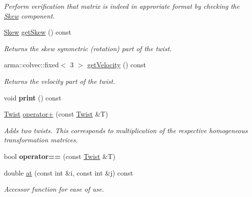 \begin{DoxyCompactItemize}
\begin{DoxyCompactList}\small\item\em Perform verification that matrix is indeed in approriate format by checking the \hyperlink{class_skew}{Skew} component. \end{DoxyCompactList}\item 
\hypertarget{class_twist_ac1bb79a35b3ae5fcd78cbe805faaf1d4}{\hyperlink{class_skew}{Skew} \hyperlink{class_twist_ac1bb79a35b3ae5fcd78cbe805faaf1d4}{get\+Skew} () const }\label{class_twist_ac1bb79a35b3ae5fcd78cbe805faaf1d4}

\begin{DoxyCompactList}\small\item\em Returns the skew symmetric (rotation) part of the twist. \end{DoxyCompactList}\item 
\hypertarget{class_twist_aec0ab96d3cc03f1c280cc01fc6cfda3f}{arma\+::colvec\+::fixed$<$ 3 $>$ \hyperlink{class_twist_aec0ab96d3cc03f1c280cc01fc6cfda3f}{get\+Velocity} () const }\label{class_twist_aec0ab96d3cc03f1c280cc01fc6cfda3f}

\begin{DoxyCompactList}\small\item\em Returns the velocity part of the twist. \end{DoxyCompactList}\item 
\hypertarget{class_twist_a72a0c4cda47dcd5262280cc51149d2c1}{void {\bfseries print} () const }\label{class_twist_a72a0c4cda47dcd5262280cc51149d2c1}

\item 
\hypertarget{class_twist_a9edb824a00487857996ab2fb9b1437e4}{\hyperlink{class_twist}{Twist} \hyperlink{class_twist_a9edb824a00487857996ab2fb9b1437e4}{operator+} (const \hyperlink{class_twist}{Twist} \&T)}\label{class_twist_a9edb824a00487857996ab2fb9b1437e4}

\begin{DoxyCompactList}\small\item\em Adds two twists. This corresponds to multiplication of the respective homogeneous transformation matrices. \end{DoxyCompactList}\item 
\hypertarget{class_twist_a6ee2191b6fdff2922045707a88aa036f}{bool {\bfseries operator==} (const \hyperlink{class_twist}{Twist} \&T)}\label{class_twist_a6ee2191b6fdff2922045707a88aa036f}

\item 
double \hyperlink{class_twist_adb6e00664c4656a9131389005fcfad50}{at} (const int \&i, const int \&j) const 
\begin{DoxyCompactList}\small\item\em Accessor function for ease of use. \end{DoxyCompactList}\end{DoxyCompactItemize}
